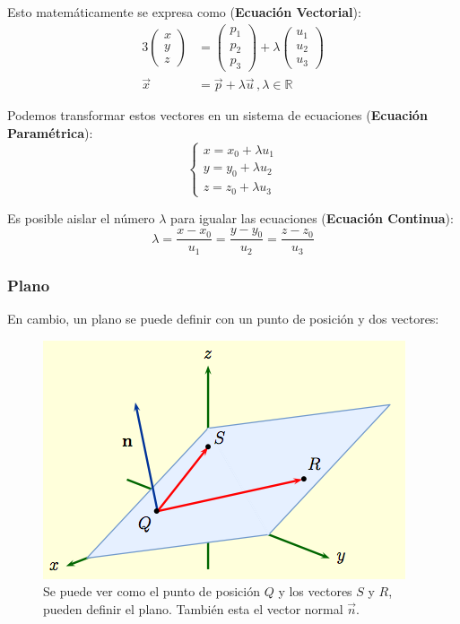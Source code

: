 \documentclass[arial,a4paper,print]{article}
\begin{document}
Esto matemáticamente se expresa como (\textbf{Ecuación Vectorial}):
\begin{alignat*}{3}
	\begin{pmatrix} x \\ y \\ z \end{pmatrix} 
	&= \begin{pmatrix} p_{1} \\ p_{2} \\ p_{3} \end{pmatrix} 
	+\lambda\begin{pmatrix} u_{1} \\ u_{2} \\ u_{3} \end{pmatrix} 
\\
\vec{x} &=\vec{p} +\lambda\vec{u}\, , \lambda \in \mathbb{R}
\end{alignat*}

Podemos transformar estos vectores en un sistema de ecuaciones (\textbf{Ecuación Paramétrica}):
\begin{equation*}
	\begin{cases}
		x = x_{0} + \lambda u_{1} \\
		y = y_{0} + \lambda u_{2} \\
		z = z_{0} + \lambda u_{3} 
	\end{cases}
\end{equation*}

Es posible aislar el número $\lambda$ para igualar las ecuaciones (\textbf{Ecuación Continua}):
\begin{equation*}
	\lambda = \frac{x -x_{0}}{u_{1}} = \frac{y -y_{0}}{u_{2}} = \frac{z -z_{0}}{u_{3}}
\end{equation*}

\subsubsection{Plano}
En cambio, un plano se puede definir con un punto de posición y dos vectores:
\begin{figure}[H]
	\centering
	\includegraphics[width=0.4\linewidth]{figures/plane_equation}
	\caption{Se puede ver como el punto de posición $Q$ y los vectores $S$ y $R$, pueden definir el plano. También esta el vector normal $\vec{n}$.}
	\label{fig:planeequation}
\end{figure}
\end{document}
